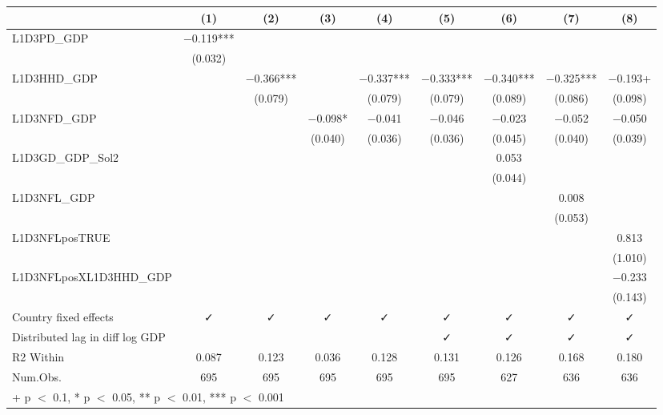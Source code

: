 \begin{table}
\centering
\begin{tabular}[t]{lcccccccc}
\toprule
  & (1) & (2) & (3) & (4) & (5) & (6) & (7) & (8)\\
\midrule
L1D3PD\_GDP & \num{-0.119}*** &  &  &  &  &  &  & \\
 & (\num{0.032}) &  &  &  &  &  &  & \\
L1D3HHD\_GDP &  & \num{-0.366}*** &  & \num{-0.337}*** & \num{-0.333}*** & \num{-0.340}*** & \num{-0.325}*** & \num{-0.193}+\\
 &  & (\num{0.079}) &  & (\num{0.079}) & (\num{0.079}) & (\num{0.089}) & (\num{0.086}) & (\num{0.098})\\
L1D3NFD\_GDP &  &  & \num{-0.098}* & \num{-0.041} & \num{-0.046} & \num{-0.023} & \num{-0.052} & \num{-0.050}\\
 &  &  & (\num{0.040}) & (\num{0.036}) & (\num{0.036}) & (\num{0.045}) & (\num{0.040}) & (\num{0.039})\\
L1D3GD\_GDP\_Sol2 &  &  &  &  &  & \num{0.053} &  & \\
 &  &  &  &  &  & (\num{0.044}) &  & \\
L1D3NFL\_GDP &  &  &  &  &  &  & \num{0.008} & \\
 &  &  &  &  &  &  & (\num{0.053}) & \\
L1D3NFLposTRUE &  &  &  &  &  &  &  & \num{0.813}\\
 &  &  &  &  &  &  &  & (\num{1.010})\\
L1D3NFLposXL1D3HHD\_GDP &  &  &  &  &  &  &  & \num{-0.233}\\
 &  &  &  &  &  &  &  & (\num{0.143})\\
\midrule
Country fixed effects & ✓ & ✓ & ✓ & ✓ & ✓ & ✓ & ✓ & ✓\\
Distributed lag in diff log GDP &  &  &  &  & ✓ & ✓ & ✓ & ✓\\
R2 Within & \num{0.087} & \num{0.123} & \num{0.036} & \num{0.128} & \num{0.131} & \num{0.126} & \num{0.168} & \num{0.180}\\
Num.Obs. & \num{695} & \num{695} & \num{695} & \num{695} & \num{695} & \num{627} & \num{636} & \num{636}\\
\bottomrule
\multicolumn{9}{l}{\rule{0pt}{1em}+ p $<$ 0.1, * p $<$ 0.05, ** p $<$ 0.01, *** p $<$ 0.001}\\
\end{tabular}
\end{table}
